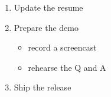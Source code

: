 \documentclass{article}
\begin{document}
\begin{enumerate}
\item Update the resume
\item Prepare the demo
  \begin{itemize}
  \item record a screencast
  \item rehearse the Q and A
  \end{itemize}
\item Ship the release
\end{enumerate}
\end{document}
